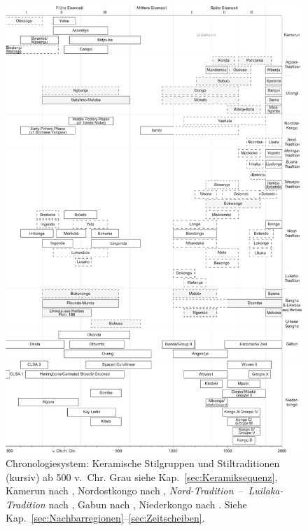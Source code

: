 \begin{figure}[p]
	\centering
	\includegraphics[height = .9\textheight]{fig/Chronologiesystem_v4.pdf}
	\caption{Chronologiesystem: Keramische Stilgruppen und Stiltraditionen (kursiv) ab 500 v.~Chr. Grau siehe Kap.~\ref{sec:Keramiksequenz}, Kamerun nach \textcites{Eggert.2006b}{Meister.2008b}{GouemGouem.20102011}{NlendNlend.20132014}, Nordostkongo nach \textcite{LivingstoneSmith.2017}, \textit{Nord-Tradition}~--~\textit{Luilaka-Tradition} nach \textcite{Wotzka.1995}, Gabun nach \textcites{Clist.20042005}{SanchezElipe.2015}{SanchezElipe.2016}, Niederkongo nach \textcites{deMaret.1982b}{deMaret.1982c}{deMaret.1986}{Gosselain.1988}{Denbow.2012}{Denbow.2014}{Cranshof.2018}{Clist.2018c}. Siehe Kap.~\ref{sec:Nachbarregionen}--\ref{sec:Zeitscheiben}.}
	\label{fig:Chronologiesystem}
\end{figure}

